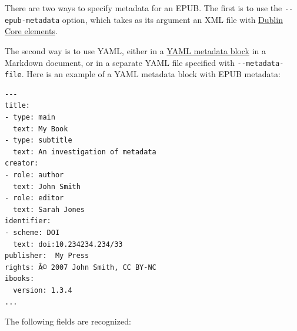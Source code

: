 \documentclass[
]{article}
\begin{document}
There are two ways to specify metadata for an EPUB. The first is to use
the \texttt{-\/-epub-metadata} option, which takes as its argument an
XML file with
\href{https://www.dublincore.org/specifications/dublin-core/dces/}{Dublin
Core elements}.

The second way is to use YAML, either in a
\protect\hyperlink{extension-yaml_metadata_block}{YAML metadata block}
in a Markdown document, or in a separate YAML file specified with
\texttt{-\/-metadata-file}. Here is an example of a YAML metadata block
with EPUB metadata:

\begin{verbatim}
---
title:
- type: main
  text: My Book
- type: subtitle
  text: An investigation of metadata
creator:
- role: author
  text: John Smith
- role: editor
  text: Sarah Jones
identifier:
- scheme: DOI
  text: doi:10.234234.234/33
publisher:  My Press
rights: Â© 2007 John Smith, CC BY-NC
ibooks:
  version: 1.3.4
...
\end{verbatim}

The following fields are recognized:
\end{document}
